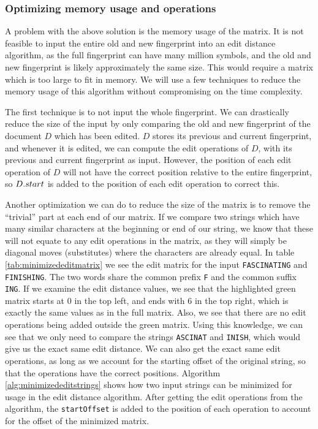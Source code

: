 \subsubsection{Optimizing memory usage and operations}

A problem with the above solution is the memory usage of the matrix. It is not feasible to
input the entire old and new fingerprint into an edit distance algorithm, as the full
fingerprint can have many million symbols, and the old and new fingerprint is likely
approximately the same size. This would require a matrix which is too large to fit in
memory. We will use a few techniques to reduce the memory usage of this algorithm without
compromising on the time complexity.

The first technique is to not input the whole fingerprint. We can drastically reduce the
size of the input by only comparing the old and new fingerprint of the document $D$ which
has been edited. $D$ stores its previous and current fingerprint, and whenever it is
edited, we can compute the edit operations of $D$, with its previous and current
fingerprint as input. However, the position of each edit operation of $D$ will not have
the correct position relative to the entire fingerprint, so ${{D}.{start}}$ is
added to the position of each edit operation to correct this.

Another optimization we can do to reduce the size of the matrix is to remove the
``trivial'' part at each end of our matrix. If we compare two strings which have many
similar characters at the beginning or end of our string, we know that these will not
equate to any edit operations in the matrix, as they will simply be diagonal moves
(substitutes) where the characters are already equal. In table
\ref{tab:minimizededitmatrix} we see the edit matrix for the input \verb|FASCINATING| and
\verb|FINISHING|. The two words share the common prefix \verb|F| and the common suffix
\verb|ING|. If we examine the edit distance values, we see that the highlighted green
matrix starts at $0$ in the top left, and ends with $6$ in the top right, which is exactly
the same values as in the full matrix. Also, we see that there are no edit operations
being added outside the green matrix. Using this knowledge, we can see that we only need
to compare the strings \verb|ASCINAT| and \verb|INISH|, which would give us the exact same
edit distance. We can also get the exact same edit operations, as long as we account for
the starting offset of the original string, so that the operations have the correct
positions. Algorithm \ref{alg:minimizededitstrings} shows how two input strings can be
minimized for usage in the edit distance algorithm. After getting the edit operations from
the algorithm, the \verb|startOffset| is added to the position of each operation to
account for the offset of the minimized matrix.

